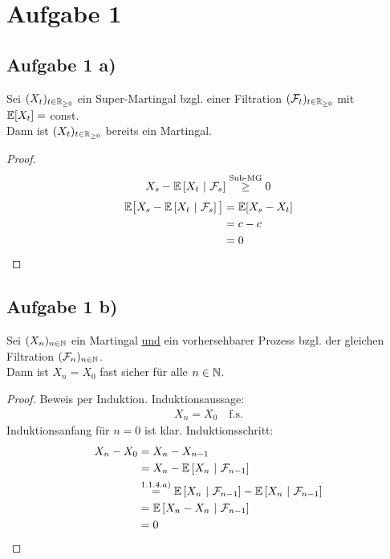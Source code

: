 \documentclass[12pt,a4paper]{article}
\author{Willi Sontopski}
\begin{document}

\section*{Aufgabe 1}
\subsection*{Aufgabe 1 a)}
Sei $(X_t)_{t\in\mathbb{R}_{\geq0}}$ ein Super-Martingal bzgl. einer Filtration $(\mathcal{F}_t)_{t\in\mathbb{R}_{\geq0}}$ mit\\ $\mathbb{E}[X_t]=$ const.\\
Dann ist $(X_t)_{t\in\mathbb{R}_{\geq0}}$ bereits ein Martingal.

\begin{proof}
	\begin{align*}
		X_s - \mathbb{E}\left[{X_t}~|~{\mathcal{F}_s}\right] \stackrel{\text{Sub-MG}}{\geq} 0
	\end{align*}
	\begin{align*}
		\mathbb{E}\big[X_s - \mathbb{E}\left[{X_t}~|~{\mathcal{F}_s}\right] \big]
		&= \mathbb{E}[X_s - X_t] \\
		&= c-c \\
		&= 0
	\end{align*}
\end{proof}

\subsection*{Aufgabe 1 b)}
Sei $(X_n)_{n\in\mathbb{N}}$ ein Martingal \underline{und} ein vorhersehbarer Prozess bzgl. der gleichen Filtration $(\mathcal{F}_n)_{n\in\mathbb{N}}$.\\
Dann ist $X_n=X_0$ fast sicher für alle $n\in\mathbb{N}$.

\begin{proof}
	Beweis per Induktion. 
	Induktionsaussage:
	\begin{align*}
		X_n = X_0 \quad \text{f.s.}
	\end{align*}
	Induktionsanfang für $n=0$ ist klar.
	Induktionsschritt:
	\begin{align*}
		X_n-X_0
		&= X_n - X_{n-1} \\
		&= X_n - \mathbb{E}\left[{X_n}~|~{\mathcal{F}_{n-1}}\right] \\
		&\stackrel{1.1.4.a)}{=} \mathbb{E}\left[{X_n}~|~{\mathcal{F}_{n-1}}\right] - \mathbb{E}\left[{X_n}~|~{\mathcal{F}_{n-1}}\right] \\
		&= \mathbb{E}\left[{X_n-X_n}~|~{\mathcal{F}_{n-1}}\right] \\
		&= 0
	\end{align*}

\end{proof}
\end{document}
